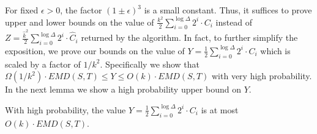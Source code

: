 \documentclass[oribibl]{llncs}
\begin{document}
For fixed $\epsilon > 0$, the factor $(1\pm\epsilon)^3$ is a small constant.
Thus, it suffices to prove upper and lower bounds on the value of
$\frac{k^2}{2}\sum_{i = 0}^{\log\Delta}2^i\cdot C_i$ instead of
$Z = \frac{\widehat{k}^2}{2}\sum_{i = 0}^{\log\Delta}2^i\cdot \widehat{C}_i$
returned by the algorithm.
In fact, to further simplify the exposition, we prove our bounds on the value of 
$Y=\frac{{1}}{2}\sum_{i = 0}^{\log\Delta}2^i\cdot C_i$ which is scaled
by a factor of $1/k^2$. Specifically we show that 
$\Omega(1/k^2)\cdot EMD(S,T)\le Y\le O(k)\cdot EMD(S,T)$ with very high probability.
In the next lemma we show a high probability upper bound on $Y$.

\begin{lemma}\label{upperbound}
With high probability, the value
$Y = \displaystyle\frac{1}{2}\sum_{i = 0}^{\log\Delta}2^i\cdot C_i$
is at most $O(k)\cdot EMD(S,T)$.
\end{lemma}
\end{document}
